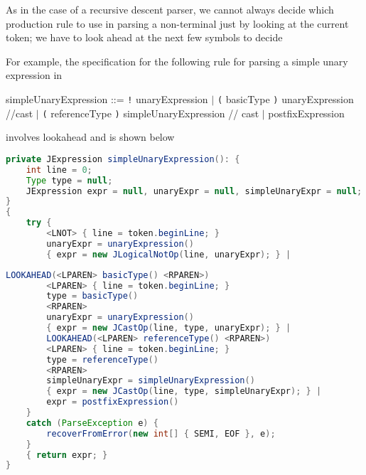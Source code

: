 \documentclass[8pt,a4paper,compress,handout]{beamer}
\newcommand{\mm}[1]{$#1$}
\newenvironment{spaced}
{
\smallskip
\hspace{.5cm}
\begin{minipage}[c]{\textwidth}
}
{
\end{minipage}
\smallskip
}
\begin{document}
\begin{frame}[fragile]
\pause

As in the case of a recursive descent parser, we cannot always decide which production rule to use in parsing a non-terminal just by looking at the current token; we have to look ahead at the next few symbols to decide

\pause
\bigskip

For example, the specification for the following rule for parsing a simple unary expression in \jmm

\text{ }
\begin{spaced}
\begin{production}
simpleUnaryExpression ::= \lstinline{!} unaryExpression
                                   \mm{|} \lstinline{(} basicType \lstinline{)}  unaryExpression //cast
                                   \mm{|} \lstinline{(} referenceType \lstinline{)} simpleUnaryExpression // cast
                                   \mm{|} postfixExpression
\end{production}
\end{spaced}
\noindent involves lookahead and is shown below

\begin{lstlisting}[language=Java]
private JExpression simpleUnaryExpression(): {
    int line = 0;
    Type type = null;
    JExpression expr = null, unaryExpr = null, simpleUnaryExpr = null;
}
{
    try {
        <LNOT> { line = token.beginLine; }
        unaryExpr = unaryExpression()
        { expr = new JLogicalNotOp(line, unaryExpr); } |
\end{lstlisting}
\end{frame}

\begin{frame}[fragile]
\pause

\begin{lstlisting}[language=Java]
        LOOKAHEAD(<LPAREN> basicType() <RPAREN>)
        <LPAREN> { line = token.beginLine; }
        type = basicType()
        <RPAREN>
        unaryExpr = unaryExpression()
        { expr = new JCastOp(line, type, unaryExpr); } |
        LOOKAHEAD(<LPAREN> referenceType() <RPAREN>)
        <LPAREN> { line = token.beginLine; }
        type = referenceType()
        <RPAREN>
        simpleUnaryExpr = simpleUnaryExpression()
        { expr = new JCastOp(line, type, simpleUnaryExpr); } |
        expr = postfixExpression()
    }
    catch (ParseException e) {
        recoverFromError(new int[] { SEMI, EOF }, e);
    }
    { return expr; }
}
\end{lstlisting}
\end{frame}
\end{document}

